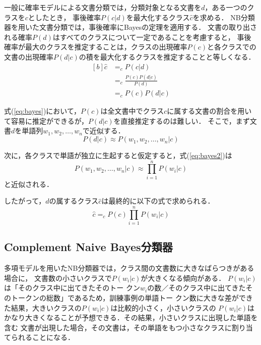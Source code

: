 \documentclass[japanese]{jnlp_1.4}
\newcommand{\argmax}{}
\begin{document}
一般に確率モデルによる文書分類では，分類対象となる文書を$d$，ある一つのクラスを$c$としたとき，
事後確率$P(c|d)$を最大化するクラス$\hat{c}$を求める\cite{Zhang}．
NB分類器を用いた文書分類では，事後確率にBayesの定理を適用する．
文書の取り出される確率$P(d)$はすべてのクラスについて一定であることを考慮すると，
事後確率が最大のクラスを推定することは，クラスの出現確率$P(c)$と各クラスでの文書の出現確率$P(d|c)$の積を最大化するクラスを推定することと等しくなる．
\begin{equation}
\begin{aligned}[b]
\hat{c} & = \argmax_{c} P(c|d)  \\
 & = \argmax_{c} \frac{P(c)P(d|c)}{P(d)}  \\
 & = \argmax_{c} P(c) P(d|c) 
\end{aligned}
\label{eq:bayes}
\end{equation}

式(\ref{eq:bayes})において，$P(c)$は全文書中でクラス$c$に属する文書の割合を用いて容易に推定ができるが，$P(d|c)$を直接推定するのは難しい．
そこで，まず文書$d$を単語列$w_1, w_2, \ldots , w_n$で近似する．
\begin{equation}
P(d|c) \approx P(w_1,w_2,\ldots,w_n|c) \label{eq:bayes2}
\end{equation}

次に，各クラスで単語が独立に生起すると仮定すると，式(\ref{eq:bayes2})は
\begin{equation}
P(w_1,w_2,\ldots,w_n|c)\approx\prod_{i=1}^{n} P(w_i|c) \label{eq:bayes3}
\end{equation}
と近似される．

したがって，$d$の属するクラス$\hat{c}$は最終的に以下の式で求められる．
\begin{equation}
\hat{c}=\argmax_{c} P(c) \prod_{i=1}^{n} P(w_i|c) \label{eq:rnb}
\end{equation}


\subsection{Complement Naive Bayes分類器}
\label{Sec:Complement Naive Bayes分類器}

多項モデルを用いたNB分類器では，クラス間の文書数に大きなばらつきがある場合に，
文書数の小さいクラスで$P(w_i|c)$が大きくなる傾向がある．
$P(w_i|c)$は「そのクラス中に出てきたそのトー
クン$w_i$の数／そのクラス中に出てきたそのトークンの総数」であるため，訓練事例の単語トー
クン数に大きな差ができた結果，大きいクラスの$P(w_i|c)$は比較的小さく，小さいクラスの
$P(w_i|c)$はかなり大きくなることが予想できる．その結果，小さいクラスに出現した単語を含む
文書が出現した場合，その文書は，その単語をもつ小さなクラスに割り当てられることになる．
\end{document}
